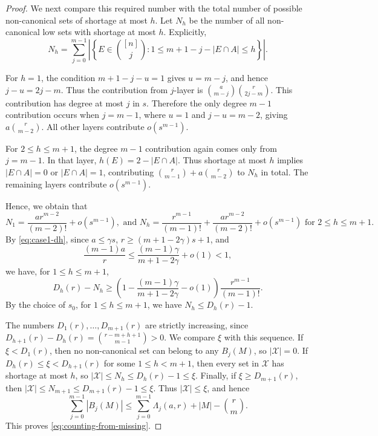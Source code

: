 \documentclass[10pt,a4paper]{article}
\numberwithin{equation}{section}
\theoremstyle{definition}
\begin{document}
\begin{proof}
    We next compare this required number with the total number of possible
    non-canonical sets of shortage at most $h$.  Let \(N_h\) be the number of
    all non-canonical low sets with shortage at most \(h\).  Explicitly,
    \[
        N_h=
        \sum_{j=0}^{m-1}
        \left|
        \left\{
        E\in\binom{[n]}j:
        1\le m+1-j-|E\cap A|\le h
        \right\}
        \right|.
    \]

    For \(h=1\), the condition \(m+1-j-u=1\) gives \(u=m-j\), and hence
    \(j-u=2j-m\).
    Thus the contribution from $j$-layer is $\binom a{m-j}\binom r{2j-m}$.
    This contribution has degree at most \(j\) in \(s\).
    Therefore the only degree \(m-1\) contribution occurs when \(j=m-1\), where \(u=1\) and \(j-u=m-2\), giving $a\binom r{m-2}$.
    All other layers contribute $o(s^{m-1})$.

    For \(2\le h\le m+1\), the degree \(m-1\) contribution again comes only from \(j=m-1\).
    In that layer, $h(E)=2-|E\cap A|$.
    Thus shortage at most \(h\) implies \(|E\cap A|=0\) or \(|E\cap A|=1\), contributing $\binom r{m-1}+a\binom r{m-2}$ to $N_h$ in total.
    The remaining layers contribute $o(s^{m-1})$.

    Hence, we obtain that
    \[
        N_1=\frac{a r^{m-2}}{(m-2)!}+o(s^{m-1}),
        \text{ and }
        N_h=
        \frac{r^{m-1}}{(m-1)!}
        +
        \frac{a r^{m-2}}{(m-2)!}
        +
        o(s^{m-1})
        \text{ for $2\le h\le m+1$.}
    \]
    By \eqref{eq:case1-dh}, since \(a\le\gamma s\), \(r\ge(m+1-2\gamma)s+1\), and
    \[
        \frac{(m-1)a}{r}
        \le
        \frac{(m-1)\gamma}{m+1-2\gamma}+o(1)
        <1,
    \]
    we have, for $1\le h\le m+1$,
    \[
        D_h(r)-N_h
        \ge
        \left(1-\frac{(m-1)\gamma}{m+1-2\gamma}-o(1)\right)
        \frac{r^{m-1}}{(m-1)!}.
    \]
    By the choice of \(s_0\), for $1\le h\le m+1$, we have
    \(N_h\le D_h(r)-1.\)

    The numbers \(D_1(r),\ldots,D_{m+1}(r)\) are strictly increasing, since
    \(D_{h+1}(r)-D_h(r)=\binom{r-m+h+1}{m-1}>0\).  We compare \(\xi\) with
    this sequence.
    If \(\xi<D_1(r)\), then no non-canonical set can belong to any \(B_j(M)\), so \(|\mathcal X|=0\).
    If \(D_h(r)\le\xi<D_{h+1}(r)\) for some \(1\le h<m+1\), then every set in \(\mathcal X\) has shortage at most \(h\), so
    \(|\mathcal X|\le N_h\le D_h(r)-1\le\xi.\)
    Finally, if \(\xi\ge D_{m+1}(r)\), then \(|\mathcal X|\le N_{m+1}\le D_{m+1}(r)-1\le\xi\).
    Thus \(|\mathcal X|\le\xi\), and hence
    \[
        \sum_{j=0}^{m-1}|B_j(M)|
        \le
        \sum_{j=0}^{m-1}\Lambda_j(a,r)+|M|-\binom rm.
    \]
    This proves \eqref{eq:counting-from-missing}.


\end{proof}
\end{document}
